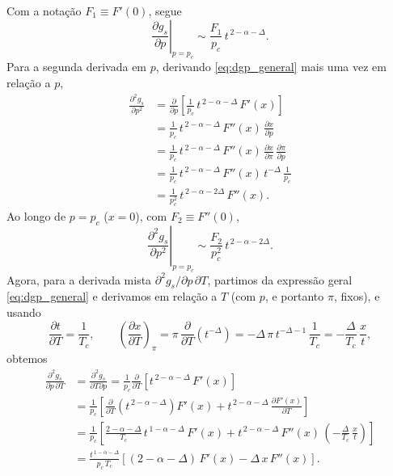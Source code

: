 \documentclass[11pt,a4paper]{article}
\newcommand{\pd}[2]{\frac{\partial #1}{\partial #2}}
\newcommand{\pdd}[2]{\frac{\partial^2 #1}{\partial #2^2}}
\begin{document}
%
Com a notação \(F_1\equiv F'(0)\), segue
%
\begin{equation}
    \left.\pd{g_s}{p}\right|_{p=p_c}
    \sim
    \frac{F_1}{p_c}\,t^{\,2-\alpha-\Delta}.
    \label{eq:dgp}
\end{equation}
%
Para a segunda derivada em \(p\), derivando \eqref{eq:dgp_general} mais uma vez em relação a \(p\),
%
\begin{align}
    \pdd{g_s}{p}
    &=
    \pd{}{p}\left[
    \frac{1}{p_c}\,
    t^{\,2-\alpha-\Delta}\,
    F'(x)
    \right] \nonumber\\
    &=
    \frac{1}{p_c}\,
    t^{\,2-\alpha-\Delta}\,
    F''(x)\,
    \pd{x}{p} \nonumber\\
    &=
    \frac{1}{p_c}\,
    t^{\,2-\alpha-\Delta}\,
    F''(x)\,
    \pd{x}{\pi}\,\pd{\pi}{p} \nonumber\\
    &=
    \frac{1}{p_c}\,
    t^{\,2-\alpha-\Delta}\,
    F''(x)\,
    t^{-\Delta}\,
    \frac{1}{p_c} \nonumber\\
    &=
    \frac{1}{p_c^{2}}\,
    t^{\,2-\alpha-2\Delta}\,
    F''(x).
    \label{eq:d2gp_general}
\end{align}
%
Ao longo de \(p=p_c\) (\(x=0\)), com \(F_2\equiv F''(0)\),
%
\begin{equation}
    \left.\pdd{g_s}{p}\right|_{p=p_c}
    \sim
    \frac{F_2}{p_c^{2}}\,t^{\,2-\alpha-2\Delta}.
    \label{eq:d2gp}
\end{equation}
%
Agora, para a derivada mista \(\partial^{2} g_s/\partial p\,\partial T\), partimos da expressão geral \eqref{eq:dgp_general} e derivamos em relação a \(T\) (com \(p\), e portanto \(\pi\), fixos), e usando
%
\begin{equation}
    \frac{\partial t}{\partial T}=\frac{1}{T_c},
    \qquad
    \left(\frac{\partial x}{\partial T}\right)_{\!\pi}
    =
    \pi\,\frac{\partial}{\partial T}\left(t^{-\Delta}\right)
    =
    -\Delta\,\pi\,t^{-\Delta-1}\,\frac{1}{T_c}
    =
    -\frac{\Delta}{T_c}\,\frac{x}{t},
\end{equation}
%
obtemos
%
\begin{align}
    \frac{\partial^{2} g_s}{\partial p\,\partial T}
    &=
    \frac{\partial^{2} g_s}{\partial T\partial p}
    =
    \frac{1}{p_c}
    \frac{\partial}{\partial T}
    \left[
    t^{\,2-\alpha-\Delta}\,
    F'(x)
    \right] \nonumber\\
    &=
    \frac{1}{p_c}
    \left[
    \frac{\partial}{\partial T}
    \left(t^{\,2-\alpha-\Delta}\right)
    F'(x)
    +
    t^{\,2-\alpha-\Delta}\,
    \frac{\partial F'(x)}{\partial T}
    \right] \nonumber\\
    &=
    \frac{1}{p_c}
    \left[
    \frac{2-\alpha-\Delta}{T_c}\,
    t^{\,1-\alpha-\Delta}\,
    F'(x)
    +
    t^{\,2-\alpha-\Delta}\,
    F''(x)\,
    \left(-\frac{\Delta}{T_c}\,\frac{x}{t}\right)
    \right] \nonumber\\
    &=
    \frac{t^{\,1-\alpha-\Delta}}{p_c\,T_c}
    \left[
    (2-\alpha-\Delta)\,F'(x)
    -
    \Delta\,x\,F''(x)
    \right].
    \label{eq:d2gpt_geral}
\end{align}
\end{document}
